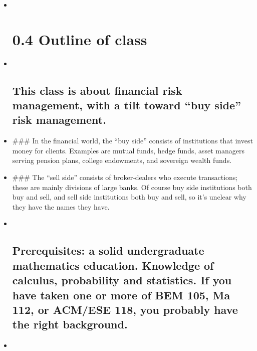 \documentclass[11pt]{article}
\begin{document}
    \begin{itemize}
\item ~
  \section{0.4 Outline of class}\label{outline-of-class}
\item ~
  \subsection{This class is about financial risk management, with a tilt
  toward ``buy side'' risk
  management.}\label{this-class-is-about-financial-risk-management-with-a-tilt-toward-buy-side-risk-management.}
\item
  \#\#\# In the financial world, the ``buy side'' consists of
  institutions that invest money for clients. Examples are mutual funds,
  hedge funds, asset managers serving pension plans, college endowments,
  and sovereign wealth funds.
\item
  \#\#\# The ``sell side'' consists of broker-dealers who execute
  transactions; these are mainly divisions of large banks. Of course buy
  side institutions both buy and sell, and sell side institutions both
  buy and sell, so it's unclear why they have the names they have.
\item ~
  \subsection{Prerequisites: a solid undergraduate mathematics
  education. Knowledge of calculus, probability and statistics. If you
  have taken one or more of BEM 105, Ma 112, or ACM/ESE 118, you
  probably have the right
  background.}\label{prerequisites-a-solid-undergraduate-mathematics-education.-knowledge-of-calculus-probability-and-statistics.-if-you-have-taken-one-or-more-of-bem-105-ma-112-or-acmese-118-you-probably-have-the-right-background.}
\item ~

\end{itemize}
\end{document}
